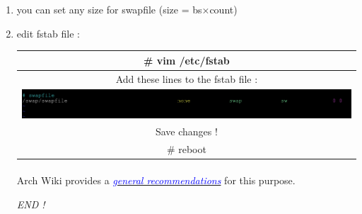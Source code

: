 \documentclass[12pt, a4paper]{article}
\begin{document}
\begin{enumerate}
	\item you can set any size for swapfile (size = bs$\times$count)
	\item edit fstab file :
	
	\begin{center}
		\begin{tabular}{|c|} \hline
			\# vim /etc/fstab\\ \hline
			Add these lines to the fstab file :\\
			\includegraphics[scale=0.4]{swapfile.png}\\ \hline
			Save changes !\\ \hline
			\# reboot\\ \hline
		\end{tabular}
	\end{center}
	
	\paragraph{}
	Arch Wiki provides a \href{https://wiki.archlinux.org/index.php/General_recommendations}{\emph{\textcolor{blue}{general recommendations}}} for this purpose.
	
	\begin{Huge}
		\begin{center}
			\textit{END !}
		\end{center}
	\end{Huge}
 
\end{enumerate}
\end{document}
